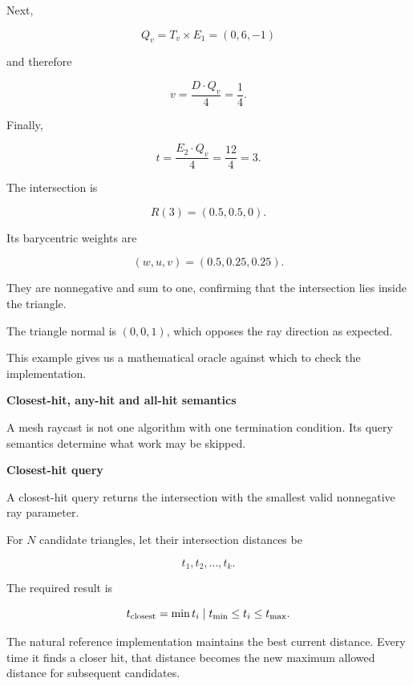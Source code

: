 Next,

\[
Q_v=T_v\times E_1=(0,6,-1)
\]

and therefore

\[
v=\frac{D\cdot Q_v}{4}=\frac14.
\]

Finally,

\[
t=\frac{E_2\cdot Q_v}{4}=\frac{12}{4}=3.
\]

The intersection is

\[
R(3)=(0.5,0.5,0).
\]

Its barycentric weights are

\[
(w,u,v)=(0.5,0.25,0.25).
\]

They are nonnegative and sum to one, confirming that the intersection lies inside the triangle.

The triangle normal is \((0,0,1)\), which opposes the ray direction as expected.

This example gives us a mathematical oracle against which to check the implementation.

\textbf{Closest-hit, any-hit and all-hit semantics}

A mesh raycast is not one algorithm with one termination condition. Its query semantics determine what work may be skipped.

\textbf{Closest-hit query}

A closest-hit query returns the intersection with the smallest valid nonnegative ray parameter.

For \(N\) candidate triangles, let their intersection distances be

\[
t_1,t_2,\ldots,t_k.
\]

The required result is

\[
t_{\text{closest}}=\min\\{t_i\mid t_{\min}\leq t_i\leq t_{\max}\\}.
\]

The natural reference implementation maintains the best current distance. Every time it finds a closer hit, that distance becomes the new maximum allowed distance for subsequent candidates.

